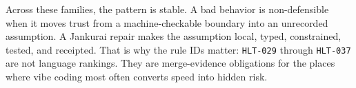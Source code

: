 Across these families, the pattern is stable. A bad behavior is non-defensible when it moves trust from a machine-checkable boundary into an unrecorded assumption. A Jankurai repair makes the assumption local, typed, constrained, tested, and receipted. That is why the rule IDs matter: \texttt{HLT-029} through \texttt{HLT-037} are not language rankings. They are merge-evidence obligations for the places where vibe coding most often converts speed into hidden risk.
